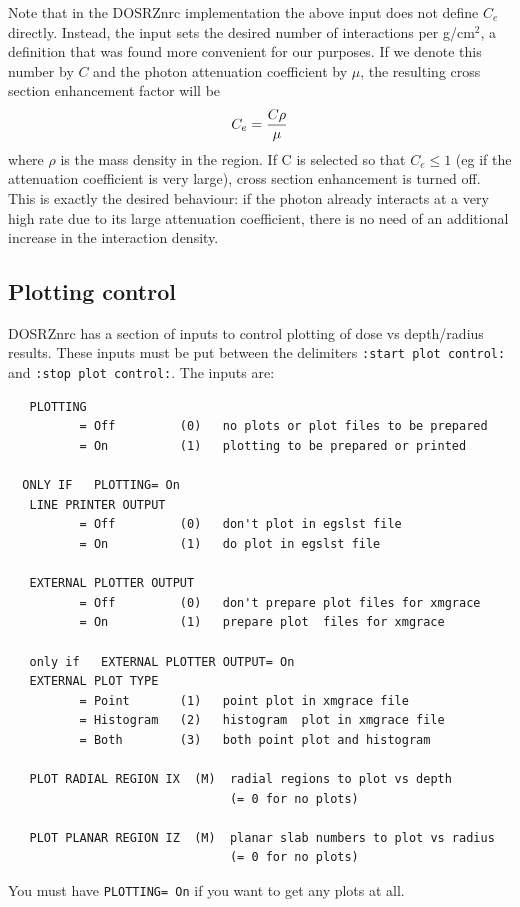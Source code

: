 \documentclass[12pt,twoside]{article}  %
\begin{document}
Note that in the DOSRZnrc implementation the above input does not define
$C_e$ directly. Instead, the input sets the desired number of interactions
per g/cm$^2$, a definition that was found more convenient for our purposes.
If we denote this number by $C$ and the photon attenuation coefficient
by $\mu$, the resulting cross section enhancement factor will be
\begin{equation}
C_e = {C \rho \over \mu}
\end{equation}
where $\rho$ is the mass density in the region. If C is selected
so that $C_e \le 1$ (eg if the attenuation coefficient is very large),
cross section enhancement is turned off. This is exactly the desired
behaviour: if the photon already interacts at a very high rate due
to its large attenuation coefficient, there is no need of an additional
increase in the interaction density.


\subsection{Plotting control}
\label{dosrzplotsect}

DOSRZnrc has a section of inputs to control plotting of dose
vs depth/radius results.  These inputs must be put between the delimiters
{\tt :start plot control:} and {\tt :stop plot control:}.  The
inputs are:
\begin{verbatim}
   PLOTTING
          = Off         (0)   no plots or plot files to be prepared
          = On          (1)   plotting to be prepared or printed

  ONLY IF   PLOTTING= On
   LINE PRINTER OUTPUT
          = Off         (0)   don't plot in egslst file
          = On          (1)   do plot in egslst file

   EXTERNAL PLOTTER OUTPUT
          = Off         (0)   don't prepare plot files for xmgrace
          = On          (1)   prepare plot  files for xmgrace

   only if   EXTERNAL PLOTTER OUTPUT= On
   EXTERNAL PLOT TYPE
          = Point       (1)   point plot in xmgrace file
          = Histogram   (2)   histogram  plot in xmgrace file
          = Both        (3)   both point plot and histogram

   PLOT RADIAL REGION IX  (M)  radial regions to plot vs depth
                               (= 0 for no plots)

   PLOT PLANAR REGION IZ  (M)  planar slab numbers to plot vs radius
                               (= 0 for no plots)
\end{verbatim}
You must have {\tt PLOTTING= On} if you want to get any plots at all.
\end{document}
